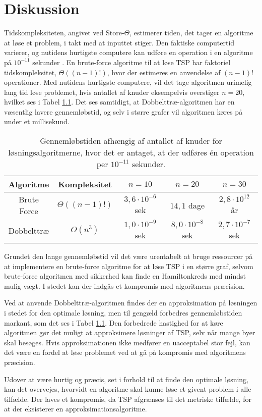 \chapter{Diskussion}

Tidskompleksiteten, angivet ved Store-$\Theta$, estimerer tiden, det tager en algoritme at løse et problem, i takt med at inputtet stiger. 
Den faktiske computertid varierer, og nutidens hurtigste computere kan udføre en operation i en algoritme på $10^{-11}$ sekunder \citep{dmat}.
En brute-force algoritme til at løse TSP har faktoriel tidskompleksitet, $\Theta((n-1)!)$, hvor der estimeres en anvendelse af $(n-1)!$ operationer.
Med nutidens hurtigste computere, vil det tage algoritmen urimelig lang tid løse problemet, hvis antallet af knuder eksempelvis overstiger $n=20$, hvilket ses i Tabel \ref{tab_algtsp}. 
Det ses samtidigt, at Dobbelttræ-algoritmen har en væsentlig lavere gennemløbstid, og selv i større grafer vil algoritmen køres på under et millisekund. 

\begin{table}[h]
 \centering
  \begin{tabular}{|c|c|c|c|c|}
   \hline
   Algoritme & Kompleksitet & $n=10$ & $n=20$ & $n=30$\\
   \hline
		Brute Force & $\Theta((n-1)!)$ & $3,6 \cdot 10^{-6}$ sek & $14,1$ dage & $2,8 \cdot 10^{12}$ år \\
   \hline
   Dobbelttræ & $O(n^3)$ & $1,0 \cdot 10^{-9}$ sek & $8,0 \cdot 10^{-8}$ sek & $2,7 \cdot 10^{-7}$ sek \\
   \hline
  \end{tabular}
 \caption{Gennemløbstiden afhængig af antallet af knuder for løsningsalgoritmerne, hvor det er antaget, at der udføres én operation per $10^{-11}$ sekunder.} \label{tab_algtsp}
\end{table}

Grundet den lange gennemløbstid vil det være urentabelt at bruge ressourcer på at implementere en brute-force algoritme for at løse TSP i en større graf, selvom brute-force algoritmen med sikkerhed kan finde en Hamiltonkreds med mindst mulig vægt. 
I stedet kan der indgås et kompromis med algoritmens præcision. 

Ved at anvende Dobbelttræ-algoritmen findes der en approksimation på løsningen i stedet for den optimale løsning, men til gengæld forbedres gennemløbstiden markant, som det ses i Tabel \ref{tab_algtsp}. 
Den forbedrede hastighed for at køre algoritmen gør det muligt at approksimere løsninger af TSP, selv når mange byer skal besøges. 
Hvis approksimationen ikke medfører en uacceptabel stor fejl, kan det være en  fordel at løse problemet ved at gå på kompromis med algoritmens præcision.

Udover at være hurtig og præcis, set i forhold til at finde den optimale løsning, kan det overvejes, hvorvidt en algoritme skal kunne løse et givent problem i alle tilfælde. 
Der laves et kompromis, da TSP afgrænses til det metriske tilfælde, for at der eksisterer en approksimationsalgoritme.